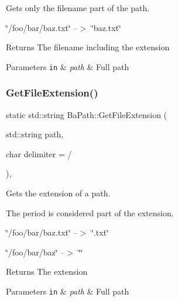 Gets only the filename part of the path. 


\begin{DoxyItemize}
\item \char`\"{}/foo/bar/baz.\+txt\char`\"{} --$>$ \char`\"{}baz.\+txt\char`\"{}
\end{DoxyItemize}

\begin{DoxyReturn}{Returns}
The filename including the extension 
\end{DoxyReturn}

\begin{DoxyParams}[1]{Parameters}
\mbox{\tt in}  & {\em path} & Full path \\
\hline
\end{DoxyParams}
\mbox{\label{namespaceBaPath_a96f0d430e53152e28075df8445cc676c}} 
\subsubsection{\texorpdfstring{Get\+File\+Extension()}{GetFileExtension()}}
{\footnotesize\ttfamily static std\+::string Ba\+Path\+::\+Get\+File\+Extension (\begin{DoxyParamCaption}\item[{std\+::string}]{path,  }\item[{char}]{delimiter = {\ttfamily \textquotesingle{}/\textquotesingle{}} }\end{DoxyParamCaption})\hspace{0.3cm}{\ttfamily [inline]}, {\ttfamily [static]}}



Gets the extension of a path. 

The period is considered part of the extension.
\begin{DoxyItemize}
\item \char`\"{}/foo/bar/baz.\+txt\char`\"{} --$>$ \char`\"{}.\+txt\char`\"{}
\item \char`\"{}/foo/bar/baz\char`\"{} --$>$ \char`\"{}\char`\"{}
\end{DoxyItemize}

\begin{DoxyReturn}{Returns}
The extension 
\end{DoxyReturn}

\begin{DoxyParams}[1]{Parameters}
\mbox{\tt in}  & {\em path} & Full path \\
\hline
\end{DoxyParams}
\mbox{\label{namespaceBaPath_a79ec43e1258100ad926c954d03ea06fb}} 
